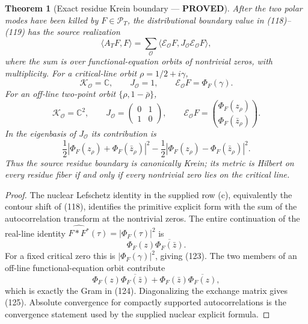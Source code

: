 \documentclass[11pt]{article}
\newtheorem{theorem}{Theorem}
\newcommand{\PROVED}{\textcolor{green!45!black}{\textbf{PROVED}}}
\begin{document}
\begin{theorem}[Exact residue Krein boundary --- \PROVED]
After the two polar modes have been killed by $F\in\mathcal P_T$, the
distributional boundary value in (118)--(119) has the source realization
\begin{equation}
 \langle A_TF,F\rangle
 =\sum_{\mathcal O}\langle
     \mathcal E_{\mathcal O}F,
     J_{\mathcal O}\mathcal E_{\mathcal O}F\rangle,   \tag{122}
\end{equation}
where the sum is over functional-equation orbits of nontrivial zeros,
with multiplicity.  For a critical-line orbit $\rho=1/2+i\gamma$,
\begin{equation}
 \mathcal K_{\mathcal O}=\mathbb C,\qquad
 J_{\mathcal O}=1,\qquad
 \mathcal E_{\mathcal O}F=\Phi_F(\gamma).             \tag{123}
\end{equation}
For an off-line two-point orbit
$\{\rho,1-\bar\rho\}$,
\begin{equation}
 \mathcal K_{\mathcal O}=\mathbb C^2,\qquad
 J_{\mathcal O}=\begin{pmatrix}0&1\\1&0\end{pmatrix},\qquad
 \mathcal E_{\mathcal O}F=
 \binom{\Phi_F(z_\rho)}{\Phi_F(\bar z_\rho)}.         \tag{124}
\end{equation}
In the eigenbasis of $J_{\mathcal O}$ its contribution is
\begin{equation}
 \frac12|\Phi_F(z_\rho)+\Phi_F(\bar z_\rho)|^2
 -\frac12|\Phi_F(z_\rho)-\Phi_F(\bar z_\rho)|^2.     \tag{125}
\end{equation}
Thus the source residue boundary is canonically Krein; its metric is Hilbert
on every residue fiber if and only if every nontrivial zero lies on the
critical line.
\end{theorem}

\begin{proof}
The nuclear Lefschetz identity in the supplied row (c), equivalently the
contour shift of (118), identifies the primitive explicit form with the sum
of the autocorrelation transform at the nontrivial zeros.  The entire
continuation of the real-line identity
$\widehat{F*F^*}(\tau)=|\Phi_F(\tau)|^2$ is
\[
 \Phi_F(z)\overline{\Phi_F(\bar z)}.
\]
For a fixed critical zero this is $|\Phi_F(\gamma)|^2$, giving (123).  The
two members of an off-line functional-equation orbit contribute
\[
 \Phi_F(z)\overline{\Phi_F(\bar z)}
 +\Phi_F(\bar z)\overline{\Phi_F(z)},
\]
which is exactly the Gram in (124).  Diagonalizing the exchange matrix gives
(125).  Absolute convergence for compactly supported autocorrelations is the
convergence statement used by the supplied nuclear explicit formula.
\end{proof}
\end{document}
